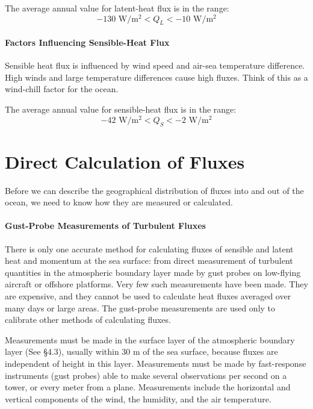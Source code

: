 The average annual value for latent-heat flux is in the range:
\begin{equation}
-130 \text{\ W/m$^2$} < Q_{L} < -10 \text{\ W/m$^2$}
\end{equation}

\paragraph{Factors Influencing Sensible-Heat Flux}
Sensible heat flux is influenced by wind
speed and air-sea temperature difference. High winds and large
temperature differences cause high fluxes. Think of this as a
wind-chill factor for the ocean.

The average annual value for sensible-heat flux is in the range:
\begin{equation}
-42 \text{\ W/m$^2$} < Q_{S} < -2 \text{\ W/m$^2$}
\end{equation}

\section[Direct Calculation of Fluxes]{Direct Calculation of Fluxes}
Before we can describe the geographical distribution of fluxes into
and out of the ocean, we need to know how they are measured or
calculated.

\paragraph{Gust-Probe Measurements of Turbulent Fluxes}
There is only
one accurate method for calculating fluxes of sensible and latent heat
and momentum at the sea surface: from direct measurement of turbulent
quantities in the atmospheric boundary layer made by gust probes on
low-flying aircraft or offshore platforms. Very few such measurements
have been made. They are expensive, and they cannot be used to
calculate heat fluxes averaged over
many days or large areas. The gust-probe measurements are used only to
calibrate other methods of calculating fluxes.

\begin{enumerate}
\vitem Measurements must be made in the surface layer of the
atmospheric boundary layer (See \S 4.3), usually within 30 m of the
sea surface, because fluxes are independent of height in this layer.
\vitem Measurements must be made by fast-response instruments (gust
probes) able to make several observations per second on a tower, or
every meter from a plane.
\vitem Measurements include the horizontal and vertical components of
the wind, the humidity, and the air temperature.
\end{enumerate}

